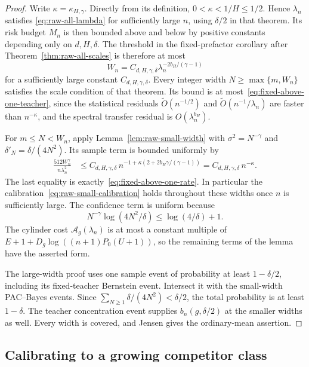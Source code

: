 \begin{proof}
Write $\kappa=\kappa_{H,\gamma}$.  Directly from its definition,
$0<\kappa<1/H\leq1/2$.  Hence $\lambda_n$ satisfies
\eqref{eq:raw-all-lambda} for sufficiently large $n$, using
$\delta/2$ in that theorem.  Its risk budget $M_n$ is then bounded
above and below by positive constants depending only on $d,H,\delta$.
The threshold in the fixed-prefactor corollary after
Theorem~\ref{thm:raw-all-scales} is therefore at most
\[
 W_n=C_{d,H,\gamma,\delta}\lambda_n^{-2b_H/(\gamma-1)}
\]
for a sufficiently large constant $C_{d,H,\gamma,\delta}$.  Every integer
width $N\geq\max\{m,W_n\}$ satisfies the scale condition of that
theorem.  Its bound is at most~\eqref{eq:fixed-above-one-teacher},
since the statistical residuals $\widetilde O(n^{-1/2})$ and
$\widetilde O(n^{-1}/\lambda_n)$ are faster than $n^{-\kappa}$,
and the spectral transfer residual is $O(\lambda_n^{b_H})$.

For $m\leq N<W_n$, apply Lemma~\ref{lem:raw-small-width} with
$\sigma^2=N^{-\gamma}$ and $\delta'_N=\delta/(4N^2)$.  Its sample
term is bounded uniformly by
\begin{align*}
 \frac{512W_n^\gamma}{n\lambda_n^2}
 &\leq C_{d,H,\gamma,\delta}\,
 n^{-1+\kappa(2+2b_H\gamma/(\gamma-1))}
 = C_{d,H,\gamma,\delta}\,n^{-\kappa}.
\end{align*}
The last equality is exactly~\eqref{eq:fixed-above-one-rate}.  In
particular the calibration~\eqref{eq:raw-small-calibration} holds
throughout these widths once $n$ is sufficiently large.
The confidence term is uniform because
\[
 N^{-\gamma}\log(4N^2/\delta)\leq\log(4/\delta)+1.
\]
The cylinder cost $\mathcal A_g(\lambda_n)$ is at most a constant
multiple of $E+1+D_g\log((n+1)P_0(U+1))$, so the remaining terms of
the lemma have the asserted form.

The large-width proof uses one sample event of probability at least
$1-\delta/2$, including its fixed-teacher Bernstein event.  Intersect
it with the small-width PAC--Bayes events.  Since
$\sum_{N\geq1}\delta/(4N^2)<\delta/2$, the total probability is at
least $1-\delta$.  The teacher concentration event supplies
$b_n(g,\delta/2)$ at the smaller widths as well.  Every width is
covered, and Jensen gives the ordinary-mean assertion.
\end{proof}

\subsection{Calibrating to a growing competitor class}

